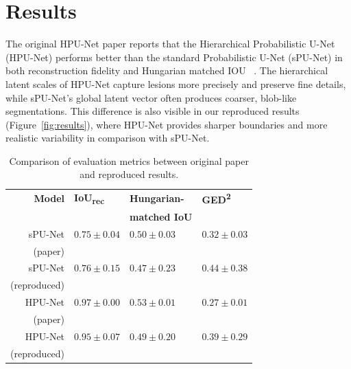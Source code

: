 \documentclass{article}
\begin{document}
\vspace{1ex}

\section{Results}
The original HPU-Net paper reports that the Hierarchical Probabilistic U-Net (HPU-Net) performs better than the standard Probabilistic U-Net (sPU-Net) in both reconstruction fidelity and Hungarian matched IOU ~\cite{Kohl2019}. The hierarchical latent scales of HPU-Net capture lesions more precisely and preserve fine details, while sPU-Net’s global latent vector often produces coarser, blob-like segmentations. This difference is also visible in our reproduced results (Figure~\ref{fig:results}), where HPU-Net provides sharper boundaries and more realistic variability in comparison with sPU-Net.

\begin{table}[H]
\centering
\caption{Comparison of evaluation metrics between original paper and reproduced results.}
\label{tab:metrics}
\begin{tabular}{|r||l|l|l|}
\hline
\textbf{Model} & \textbf{IoU\textsubscript{rec}} & \textbf{Hungarian-} & \textbf{GED\textsuperscript{2}} \\
& & \textbf{matched IoU} & \\
\hline
\hline
sPU-Net & $0.75 \pm 0.04$ & $0.50 \pm 0.03$ & $0.32 \pm 0.03$ \\
(paper) & & & \\
\hline
sPU-Net & $0.76 \pm 0.15$ & $0.47 \pm 0.23$ & $0.44 \pm 0.38$ \\
(reproduced) & & & \\
\hline
HPU-Net & $0.97 \pm 0.00$ & $0.53 \pm 0.01$ & $0.27 \pm 0.01$ \\
(paper) & & & \\
\hline
HPU-Net & $0.95 \pm 0.07$ & $0.49 \pm 0.20$ & $0.39 \pm 0.29$ \\
(reproduced) & & & \\
\hline
\end{tabular}
\end{table}
\end{document}
